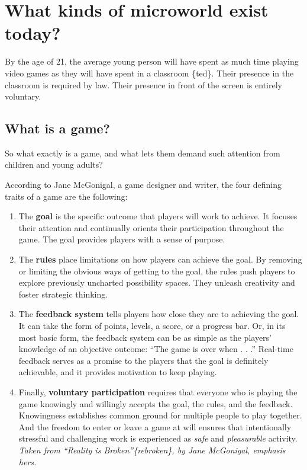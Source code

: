 \section{What kinds of microworld exist today?}

By the age of 21, the average young person will have spent as much time
playing video games as they will have spent in a classroom \{ted\}.
Their presence in the classroom is required by law. Their presence in
front of the screen is entirely voluntary.

\subsection{What is a game?}

So what exactly is a game, and what lets them demand such attention from
children and young adults?

According to Jane McGonigal, a game designer and writer, the four
defining traits of a game are the following:

\begin{enumerate}[1.]
\item
  The \textbf{goal} is the specific outcome that players will work to
  achieve. It focuses their attention and continually orients their
  participation throughout the game. The goal provides players with a
  sense of purpose.
\item
  The \textbf{rules} place limitations on how players can achieve the
  goal. By removing or limiting the obvious ways of getting to the goal,
  the rules push players to explore previously uncharted possibility
  spaces. They unleash creativity and foster strategic thinking.
\item
  The \textbf{feedback system} tells players how close they are to
  achieving the goal. It can take the form of points, levels, a score,
  or a progress bar. Or, in its most basic form, the feedback system can
  be as simple as the players' knowledge of an objective outcome: ``The
  game is over when . . .'' Real-time feedback serves as a promise to
  the players that the goal is definitely achievable, and it provides
  motivation to keep playing.
\item
  Finally, \textbf{voluntary participation} requires that everyone who
  is playing the game knowingly and willingly accepts the goal, the
  rules, and the feedback. Knowingness establishes common ground for
  multiple people to play together. And the freedom to enter or leave a
  game at will ensures that intentionally stressful and challenging work
  is experienced as \emph{safe} and \emph{pleasurable} activity.
  \emph{Taken from ``Reality is Broken''\{rebroken\}, by Jane McGonigal,
  emphasis hers.}
\end{enumerate}

